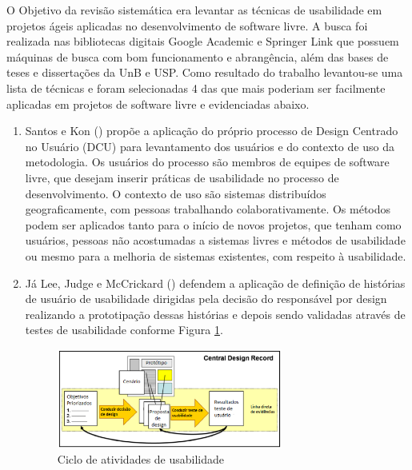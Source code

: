 O Objetivo da revisão sistemática era levantar as técnicas de usabilidade em projetos ágeis aplicadas no desenvolvimento de software livre. A busca foi realizada nas bibliotecas digitais Google Academic e Springer Link que possuem máquinas de busca com bom funcionamento e abrangência, além das bases de teses e dissertações da UnB e USP. Como resultado do trabalho levantou-se uma lista de técnicas e foram selecionadas 4 das que mais poderiam ser facilmente aplicadas em projetos de software livre e evidenciadas abaixo.

\begin{enumerate}
%
\item Santos e Kon (\citeyear{santoskon2009}) propõe a aplicação do próprio processo de Design Centrado no Usuário (DCU) para levantamento dos usuários e do contexto de uso da metodologia. Os usuários do processo são membros de equipes de software livre, que desejam inserir práticas de usabilidade no processo de desenvolvimento. O contexto de uso são sistemas distribuídos geograficamente, com pessoas trabalhando colaborativamente. Os métodos podem ser aplicados tanto para o início de novos projetos, que tenham como usuários, pessoas não acostumadas a sistemas livres e métodos de usabilidade ou mesmo para a melhoria de sistemas existentes, com respeito à usabilidade.

%
\item Já Lee, Judge e McCrickard (\citeyear{lee2011}) defendem a aplicação de definição de histórias de usuário de usabilidade dirigidas pela decisão do responsável por design realizando a prototipação dessas histórias e depois sendo validadas através de testes de usabilidade conforme Figura \ref{fig:figuraCDR}.

\begin{figure}[htpb]
  \begin{center}
    \includegraphics[width=0.7\textwidth]{figuras/figuraCDRBR.eps}
    \caption{Ciclo de atividades de usabilidade \cite{lee2011}}
    \label{fig:figuraCDR}
  \end{center}
\end{figure}


\end{enumerate}
